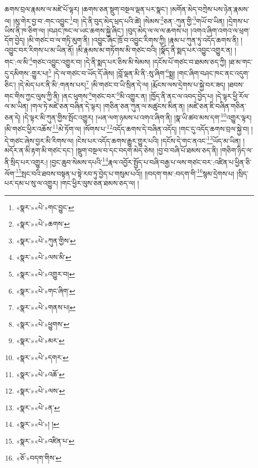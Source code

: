 ཆགས་བྲལ་རྣམས་ལ་མཛེ་པོ་ལྟར། །ཆགས་ཅན་སྡུག་བསྔལ་ལྡན་པར་སྣང་། །མགོན་མེད་བཀྲེས་པས་ཉེན་རྣམས་ལ། །མུ་གེར་བྱ་བ་:གང་འབྱུང་\footnote{«སྣར་»«པེ་»གང་བྱུང་}བ། །དེ་ནི་བུད་མེད་ཕྲད་པའི་ཚེ། །སེམས་\footnote{«སྣར་»«པེ་»ཆགས་}ཅན་:ཀུན་གྱི་\footnote{«སྣར་»«པེ་»ཀུན་གྱིས་}གཡོ་བ་ཡིན། །དྲེགས་པ་ཡིས་ནི་ཁ་ཅིག་ལ། །བཤང་ཁང་ལ་ཡང་ཆགས་སྐྱེ་ཞིང་། །བུད་མེད་ལ་ལ་ལ་ཆགས་པ། །འགའ་ཞིག་འགའ་ལ་ཕྲག་དོག་བྱེད། །མི་གཙང་བ་ལ་གཏི་མུག་ནི། །འབྱུང་ཞིང་ཁྲོ་བ་འབྱུང་རིགས་ཀྱི། །རྣམ་པ་ཀུན་ཏུ་འདོད་ཆགས་ནི། །འབྱུང་བར་རིགས་པ་མ་ཡིན་ནོ། །མི་རྣམས་མ་གཏོགས་མི་གཙང་བའི། །སྣོད་ནི་སྨད་པར་འབྱུང་འགྱུར་ན། །གང་:ལ་མི་\footnote{«སྣར་»«པེ་»ལས་མི་}གཙང་འབྱུང་འགྱུར་བ། །དེ་ནི་སྨད་པར་ཅིས་མི་སེམས། །དངོས་པོ་གཙང་བ་ཐམས་ཅད་ཀྱི། །ཐ་མ་གང་དུ་དམིགས་:གྱུར་པ།\footnote{«སྣར་»«པེ་»འགྱུར་བ།} །དེ་ལ་གཙང་བ་ཡོད་དོ་ཞེས། །བློ་ལྡན་མི་ནི་:སུ་ཞིག་\footnote{«སྣར་»«པེ་»གང་ཞིག་}སྨྲ། །གང་ཞིག་བཤང་ཁང་ནང་འདུག་ཅིང་། །དེ་མེད་པར་ནི་མི་:གནས་པར།\footnote{«སྣར་»«པེ་»གནས་པ།} །མི་གཙང་བ་ཡི་སྲིན་དེ་ལ། །རྨོངས་ལས་དྲེགས་པ་སྐྱེ་བར་ཟད། །ཐབས་གང་གིས་ཀྱང་ལུས་ཀྱི་ནི། །ནང་ཕུགས་\footnote{«སྣར་»«པེ་»ཕྱུགས་}གཙང་བར་\footnote{«སྣར་»«པེ་»མར་}མི་འགྱུར་ན། །ཁྱོད་ནི་ནང་ལ་འབད་བྱེད་པ། །དེ་ལྟར་ཕྱི་རོལ་ལ་མ་ཡིན། །གལ་ཏེ་མཛེ་ཅན་བཞིན་དེ་ལྟར། །གཅིན་ཅན་ཀུན་ལ་མཚུངས་མིན་ན། །མཛེ་ཅན་ཇི་བཞིན་གཅིན་ཅན་དེ། །དེ་ལྟར་མི་ཀུན་གྱིས་སྤོང་འགྱུར། །ཡན་ལག་ཉམས་པ་འགའ་ཞིག་ནི། །སྣ་ཡི་ཚབ་མས་དག་\footnote{«སྣར་»«པེ་»དགར་}འགྱུར་ལྟར། །མི་གཙང་ཕྱིར་འཆོས་\footnote{«སྣར་»«པེ་»འཆོ་}མེ་ཏོག་ལ། །སོགས་པ་\footnote{«སྣར་»«པེ་»ལས་}འདོད་ཆགས་དེ་བཞིན་འདོད། །གང་དུ་འདོད་ཆགས་བྲལ་སྐྱེ་བ། །དེ་གཙང་ཞེས་བྱར་མི་རིགས་ལ། །ངེས་པར་འདོད་ཆགས་རྒྱུར་གྱུར་པའི། །དངོས་དེ་གང་ནའང་\footnote{«སྣར་»«པེ་»ན་}ཡོད་མ་ཡིན། །མདོར་ན་མི་རྟག་མི་གཙང་དང་། །སྡུག་བསྔལ་བ་དང་བདག་མེད་ཅེས། །བྱ་བ་བཞི་པོ་ཐམས་ཅད་ནི། །གཅིག་ཉིད་ལ་ནི་སྲིད་པར་འགྱུར:། །བྱང་ཆུབ་སེམས་དཔའི་\footnote{«སྣར་»«པེ་»། །}རྣལ་འབྱོར་སྤྱོད་པ་བཞི་བརྒྱ་པ་ལས་གཙང་བར་:འཛིན་པ་ཕྱིན་ཅི་ལོག་\footnote{«སྣར་»«པེ་»འཛིན་པ་}སྤང་བའི་ཐབས་བསྟན་པ་སྟེ་རབ་ཏུ་བྱེད་པ་གསུམ་པའོ།། །།བདག་གམ་:བདག་གི་\footnote{«ཅོ་»བདག་གིས་}སྙམ་དྲེགས་པ། །སྲིད་པར་དམ་པ་སུ་ལ་འགྱུར། །གང་ཕྱིར་ལུས་ཅན་ཐམས་ཅད་ལ། །
